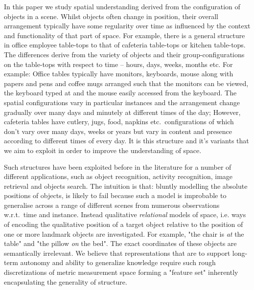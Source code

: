 \documentclass[letterpaper, 10 pt, conference]{ieeeconf}  %
\begin{document}
In this paper we study spatial understanding derived from the 
configuration of objects in a scene. Whilst objects often change 
in position, their overall arrangement typically have some regularity 
over time as influenced by the context and functionality of that 
part of space. For example, there is a general structure in office 
employee table-tops to that of cafeteria table-tops or kitchen table-tops.
The differences derive from the variety of objects and their 
group-configurations on the table-tops with respect to time -- hours, 
days, weeks, months etc. For example: Office tables typically 
have monitors, keyboards, mouse along with papers and pens 
and coffee mugs arranged such that the monitors can be viewed, the 
keyboard typed at and the mouse easily accessed from the keyboard. 
The spatial configurations vary in particular instances and the 
arrangement change gradually over many days and minutely at different 
times of the day; However, cafeteria tables have cutlery, jugs, food, 
napkins etc.\ configurations of which don't vary over many days, 
weeks or years but vary in content and presence according to different 
times of every day. It is this structure and it's variants that we aim 
to exploit in order to improve the understanding of space.

Such structures have been exploited before in the literature for a
number of different applications, such as object recognition, activity
recognition, image retrieval and objects search. The intuition is that:
bluntly modelling the absolute positions of objects, is likely to fail
because such a model is improbable to generalise across a range of
different scenes from numerous observations w.r.t.\ time and instance. Instead
qualitative \emph{relational} models of space, i.e. ways of encoding
the qualitative position of a target object relative to the position
of one or more landmark objects are investigated. For example, "the
chair is \textit{at} the table" and "the pillow \textit{on} the bed". 
The exact coordinates of these objects are semantically irrelevant. We believe that 
representations that are to support long-term autonomy and ability 
to generalize knowledge require such rough discretizations of metric 
measurement space forming a "feature set" inherently encapsulating the generality
of structure.
\end{document}
